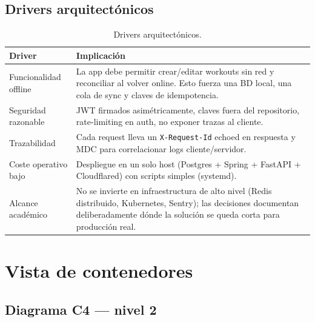 \documentclass[11pt,a4paper]{article}
\begin{document}
\subsection{Drivers arquitectónicos}

\begin{table}[H]
\centering
\begin{tabularx}{\textwidth}{lX}
\toprule
\textbf{Driver} & \textbf{Implicación} \\
\midrule
Funcionalidad offline & La app debe permitir crear/editar workouts sin red y reconciliar al volver online. Esto fuerza una BD local, una cola de sync y claves de idempotencia. \\
Seguridad razonable & JWT firmados asimétricamente, claves fuera del repositorio, rate-limiting en auth, no exponer trazas al cliente. \\
Trazabilidad & Cada request lleva un \texttt{X-Request-Id} echoed en respuesta y MDC para correlacionar logs cliente/servidor. \\
Coste operativo bajo & Despliegue en un solo host (Postgres + Spring + FastAPI + Cloudflared) con scripts simples (systemd). \\
Alcance académico & No se invierte en infraestructura de alto nivel (Redis distribuido, Kubernetes, Sentry); las decisiones documentan deliberadamente dónde la solución se queda corta para producción real. \\
\bottomrule
\end{tabularx}
\caption{Drivers arquitectónicos.}
\end{table}

\section{Vista de contenedores}

\subsection{Diagrama C4 — nivel 2}
\end{document}
